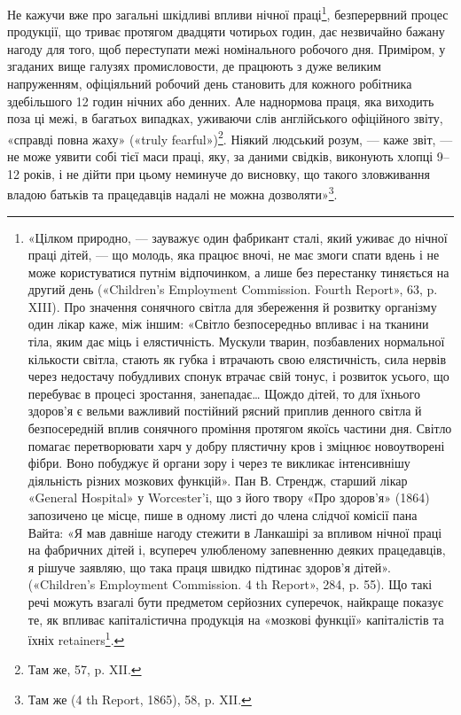 Не кажучи вже про загальні шкідливі впливи нічної праці\footnote{
«Цілком природно, — зауважує один фабрикант сталі, який
уживає до нічної праці дітей, — що молодь, яка працює вночі, не має
змоги спати вдень і не може користуватися путнім відпочинком, а лише
без перестанку тиняється на другий день («Children’s Employment Commission.
Fourth Report», 63, p. XIII). Про значення сонячного світла для
збереження й розвитку організму один лікар каже, між іншим: «Світло
безпосередньо впливає і на тканини тіла, яким дає міць і елястичність.
Мускули тварин, позбавлених нормальної кількости світла, стають як губка
і втрачають свою елястичність, сила нервів через недостачу побудливих
спонук втрачає свій тонус, і розвиток усього, що перебуває в процесі
зростання, занепадає\dots{} Щождо дітей, то для їхнього здоров’я є вельми
важливий постійний рясний приплив денного світла й безпосередній вплив
сонячного проміння протягом якоїсь частини дня. Світло помагає перетворювати
харч у добру плястичну кров і зміцнює новоутворені фібри. Воно
побуджує й органи зору і через те викликає інтенсивнішу діяльність різних
мозкових функцій». Пан В. Стрендж, старший лікар «General Hospital»
у Worcester’i, що з його твору «Про здоров’я» (1864) запозичено це
місце, пише в одному листі до члена слідчої комісії пана Вайта: «Я мав
давніше нагоду стежити в Ланкашірі за впливом нічної праці на фабричних
дітей і, всупереч улюбленому запевненню деяких працедавців, я
рішуче заявляю, що така праця швидко підтинає здоров’я дітей». («Children’s
Employment Commission. 4 th Report», 284, p. 55). Що такі речі
можуть взагалі бути предметом серйозних суперечок, найкраще показує
те, як впливає капіталістична продукція на «мозкові функції» капіталістів
та їхніх retainers\footnote*{
— прихильників. \emph{Ред.}
}.
},
безперервний процес продукції, що триває протягом двадцяти чотирьох
годин, дає незвичайно бажану нагоду для того, щоб переступати
межі номінального робочого дня. Приміром, у згаданих
вище галузях промисловости, де працюють з дуже великим напруженням,
офіціяльний робочий день становить для кожного робітника
здебільшого 12 годин нічних або денних. Але наднормова
праця, яка виходить поза ці межі, в багатьох випадках, уживаючи
слів англійського офіційного звіту, «справді повна жаху»
(«truly fearful»)\footnote{
Там же, 57, p. XII.
}. Ніякий людський розум, — каже звіт, — не
може уявити собі тієї маси праці, яку, за даними свідків, виконують
хлопці 9--12 років, і не дійти при цьому неминуче
до висновку, що такого зловживання владою батьків та працедавців
надалі не можна дозволяти»\footnote{
Там же (4 th Report, 1865), 58, p. XII.
}.

